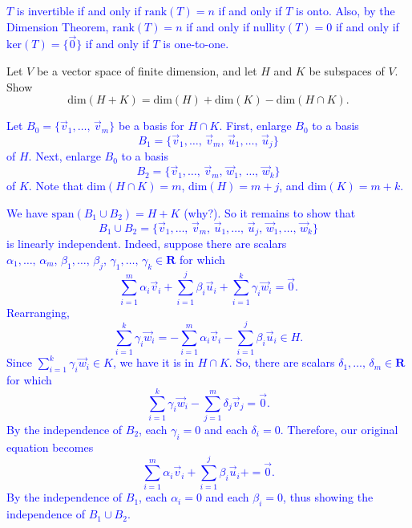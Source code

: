 \documentclass[a4paper,11pt]{article}
\newcommand{\R}{\mathbf{R}}
\newcommand{\ddim}{\text{dim}}
\newcommand{\BB}[1]{\textcolor{blue}{#1}}
\begin{document}
\BB{$T$ is invertible if and only if $\text{rank}(T)=n$ if and only if $T$ is
  onto. Also, by the Dimension Theorem, $\text{rank}(T)=n$ if and only if
  $\text{nullity}(T)=0$ if and only if $\text{ker}(T)=\{\vec 0\}$ if and only if
  $T$ is one-to-one. \\}

 Let $V$ be a vector space of finite dimension,
and let $H$ and $K$ be subspaces of $V$. Show
\[
  \ddim(H+K) = \ddim(H) + \ddim(K) - \ddim(H \cap K).
\]

\BB{Let $B_0=\{\vec v_1,\dots,\,\vec v_m\}$ be a basis for $H \cap K$. First,
  enlarge $B_0$ to a basis
  \[
    B_1=\{\vec v_1,\dots,\,\vec v_m,\,\vec u_1,\dots,\,\vec u_j\}
  \]
  of $H$. Next, enlarge $B_0$ to a basis
  \[B_2=\{\vec v_1,\dots,\,\vec v_m,\,\vec w_1,\,\dots,\,\vec w_k\}
  \]
  of $K$. Note that $\ddim(H \cap K)=m$, $\ddim(H)=m+j$, and $\ddim(K)=m+k$.}

\BB{We have $\text{span}(B_1 \cup B_2)=H+K$ (why?). So it remains to show that
  \[
    B_1  \cup B_2 = \{\vec v_1,\dots,\,\vec v_m,\,\vec u_1,\dots,\,\vec u_j,\,\vec
    w_1,\dots,\,\vec w_k\}
  \]
  is linearly independent. Indeed, suppose there are scalars
  $\alpha_1,\dots,\,\alpha_m,\,\beta_1,\dots,\,\beta_j,\,\gamma_1,\dots,\,\gamma_k
  \in \R$ for which
  \[
    \sum_{i=1}^m\alpha_i\vec v_i +
    \sum_{i=1}^j\beta_i\vec u_i +
    \sum_{i=1}^k\gamma_i\vec w_i
    = \vec 0.
  \]
  Rearranging,
  \[
    \sum_{i=1}^k\gamma_i\vec w_i = 
    -\sum_{i=1}^m\alpha_i\vec v_i -
    \sum_{i=1}^j\beta_i\vec u_i \in H.
  \]
  Since $\sum_{i=1}^k\gamma_i\vec w_i \in K$, we have it is in $H \cap K$. So,
  there are scalars $\delta_1,\dots,\,\delta_m \in \R$ for which
  \[
    \sum_{i=1}^k\gamma_i\vec w_i - \sum_{j=1}^m\delta_j\vec v_j = \vec 0.
  \]
  By the independence of $B_2$, each $\gamma_i=0$ and each $\delta_i=0$.
  Therefore, our original equation becomes
  \[
    \sum_{i=1}^m\alpha_i\vec v_i +
    \sum_{i=1}^j\beta_i\vec u_i +
    = \vec 0.
  \]
  By the independence of $B_1$, each $\alpha_i=0$ and each $\beta_i=0$, thus
  showing the independence of $B_1 \cup B_2$.}
\end{document}
